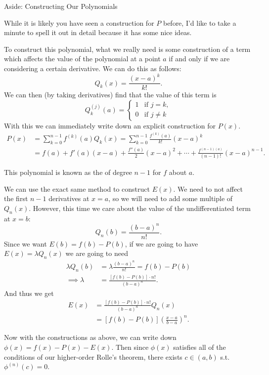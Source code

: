 \begin{aside}{Aside: Constructing Our Polynomials}

	While it is likely you have seen a construction for $P$ before, I'd like to take a minute to spell it out in detail because it has some nice ideas.

	To construct this polynomial, what we really need is some construction of a term which affects the value of the polynomial at a point $a$ if and only if we are considering a certain derivative. We can do this as follows:
	$$
		Q_{k}(x) = \frac{(x - a)^k}{k!}.
	$$
	We can then (by taking derivatives) find that the value of this term is
	$$
	Q_k^{(j)}(a) = \begin{cases}
        1 &\mbox{if } j = k, \\
        0 &\mbox{if } j \neq k
       \end{cases}
	$$
	With this we can immediately write down an explicit construction for $P(x)$.
	\begin{align*}
		P(x) &= \sum_{k = 0}^{n - 1} f^{(k)}(a) Q_k(x) = \sum_{k = 0}^{n - 1} \frac{f^{(k)}(a)}{k!}(x - a)^k \\
		&= f(a) + f'(a) (x - a) + \frac{f''(a)}{2} (x - a)^2 + \cdots + \frac{f^{(n - 1)(a)}}{(n - 1)!} (x - a)^{n - 1}.
	\end{align*}

	This polynomial is known as the  of degree $n - 1$ for $f$ about $a$. 

	We can use the exact same method to construct $E(x)$. 
	We need to not affect the first $n - 1$ derivatives at $x = a$, so we will need to add some multiple of $Q_{n}(x)$. However, this time we care about the value of the undifferentiated term at $x = b$:
	$$
	Q_{n}(b) = \frac{(b - a)^n}{n!}.
	$$
	Since we want $E(b) = f(b) - P(b)$, if we are going to have $E(x) = \lambda Q_n(x)$ we are going to need
	\begin{align*}
		\lambda Q_{n}(b) &= \lambda \frac{(b - a)^n}{n!} = f(b) - P(b) \\
\implies \lambda &= \frac{[f(b) - P(b)] \cdot n!}{(b - a)^n}.
	\end{align*}
	And thus we get
	\begin{align*}
		E(x) &= \frac{[f(b) - P(b)] \cdot n!}{(b - a)^n} Q_n(x) \\
		&= \left[f(b) - P(b)\right]\left(\frac{x - a}{b - a}\right)^n.
	\end{align*}
\end{aside}

Now with the constructions as above, we can write down $\phi(x) = f(x) - P(x) - E(x)$.
Then since $\phi(x)$ satisfies all of the conditions of our higher-order Rolle's theorem, there exists $c \in (a, b)$ s.t. $\phi^{(n)}(c) = 0$. 

